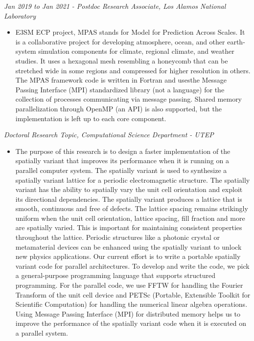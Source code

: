 \documentclass[margin]{res}
\begin{document}
\begin{resume}
{\sl Jan 2019 to Jan 2021 - Postdoc Research Associate, Los Alamos National Laboratory} %
\begin{itemize}\itemsep -2pt
\item E3SM ECP project, MPAS stands for Model for Prediction Across Scales. It is a collaborative project for developing atmosphere, ocean,  and other earth-system simulation components for climate, regional climate, and weather studies. It uses a hexagonal mesh resembling a honeycomb that can be stretched wide in some regions and compressed for higher resolution in others.
The MPAS framework code is written in Fortran and usesthe  Message Passing Interface (MPI)  standardized library (not a language) for the collection of processes communicating via message passing. Shared memory parallelization through OpenMP (an API) is also supported, but the implementation is left up to each core component.  
\end{itemize}

{\sl Doctoral Research Topic, Computational Science Department - UTEP} %
\begin{itemize}\itemsep -2pt
\item The purpose of this research is to design a faster implementation of the spatially variant that improves its performance when it is running on a parallel computer system. 
The spatially variant is used to synthesize a spatially variant lattice for a periodic electromagnetic structure. The spatially variant has the ability to spatially vary the unit
cell orientation and exploit its directional dependencies. The spatially variant produces a lattice that is smooth, continuous and free of defects. The lattice spacing remains strikingly
uniform when the unit cell orientation, lattice spacing, fill fraction and more are spatially varied. This is important for maintaining consistent properties throughout the lattice.
Periodic structures like a photonic crystal or metamaterial devices can be enhanced using the spatially variant to unlock new physics applications.
Our current effort is to write a portable spatially variant code for parallel architectures. To develop and write the code, we pick a general-purpose programming language
that supports structured programming. For the parallel code, we use FFTW for handling the Fourier Transform of the unit cell device and PETSc 
(Portable, Extensible Toolkit for Scientific Computation) for handling the numerical linear algebra operations. Using Message Passing Interface (MPI) for distributed memory
helps us to improve the performance of the spatially variant code when it is executed on a parallel system. 
\end{itemize}


\end{resume}
\end{document}
